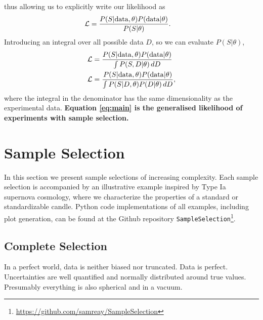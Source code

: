 \documentclass[a4paper,fleqn,usenatbib]{mnras}
\begin{document}
thus allowing us to explicitly write our likelihood as
\begin{align}
\mathcal{L}&= \frac{P(S|{\rm data},\theta) P({\rm data}|\theta)}{P(S|\theta)}.
\end{align}
Introducing an integral over all possible data $D$, so we can evaluate $P(S|\theta)$, 
\begin{align}
\mathcal{L}&= \frac{P(S|{\rm data},\theta) P({\rm data}|\theta)}{\int P(S, D|\theta)\, dD} \\
\mathcal{L} &= \frac{P(S|{\rm data},\theta) P({\rm data}|\theta)}{\int P(S | D, \theta) P(D|\theta)\, dD}, \label{eq:main}
\end{align}
where the integral in the denominator has the same dimensionality as the experimental data. \textbf{Equation \ref{eq:main} is the generalised likelihood of experiments with sample selection.}




\section{Sample Selection}
\label{sec:examples}

 In this section we present sample selections of increasing complexity. Each sample selection is accompanied by an illustrative example inspired by Type Ia supernova cosmology, where we characterize the properties of a standard or standardizable candle. Python code implementations of all examples, including plot generation, can be found at the Github repository \verb|SampleSelection|\footnote{\url{https://github.com/samreay/SampleSelection}}.
 
 
\subsection{Complete Selection}
\label{sec:perfect}
In a perfect world, data is neither biased nor truncated. Data is perfect. Uncertainties are well quantified and normally distributed around true values. Presumably everything is also spherical and in a vacuum.
\end{document}
